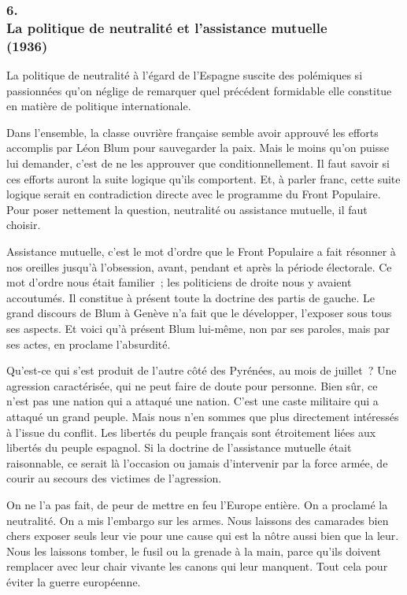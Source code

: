\documentclass[french,twoside]{book} %
\begin{document}
\subsubsection[6. La politique de neutralité et l’assistance mutuelle, (1936)]{6. \\
La politique de neutralité et l’assistance mutuelle \\
(1936)}
\noindent \par
La politique de neutralité à l'égard de l'Espagne suscite des polémiques si passionnées qu'on néglige de remarquer quel précédent formidable elle constitue en matière de politique internationale.\par
Dans l'ensemble, la classe ouvrière française semble avoir approuvé les efforts accomplis par Léon Blum pour sauvegarder la paix. Mais le moins qu'on puisse lui demander, c'est de ne les approuver que conditionnellement. Il faut savoir si ces efforts auront la suite logique qu'ils comportent. Et, à parler franc, cette suite logique serait en contradiction directe avec le programme du Front Populaire. Pour poser nettement la question, neutralité ou assistance mutuelle, il faut choisir.\par
Assistance mutuelle, c'est le mot d'ordre que le Front Populaire a fait résonner à nos oreilles jusqu'à l'obsession, avant, pendant et après la période électorale. Ce mot d'ordre nous était familier ; les politiciens de droite nous y avaient accoutumés. Il constitue à présent toute la doctrine des partis de gauche. Le grand discours de Blum à Genève n'a fait que le développer, l'exposer sous tous ses aspects. Et voici qu'à présent Blum lui-même, non par ses paroles, mais par ses actes, en proclame l'absurdité.\par
Qu'est-ce qui s'est produit de l'autre côté des Pyrénées, au mois de juillet ? Une agression caractérisée, qui ne peut faire de doute pour personne. Bien sûr, ce n'est pas une nation qui a attaqué une nation. C'est une caste militaire qui a attaqué un grand peuple. Mais nous n'en sommes que plus directement intéres­sés à l'issue du conflit. Les libertés du peuple français sont étroitement liées aux libertés du peuple espagnol. Si la doctrine de l'assistance mutuelle était raisonnable, ce serait là l'occasion ou jamais d'intervenir par la force armée, de courir au secours des victimes de l'agression.\par
On ne l'a pas fait, de peur de mettre en feu l'Europe entière. On a proclamé la neutralité. On a mis l'embargo sur les armes. Nous laissons des camarades bien chers exposer seuls leur vie pour une cause qui est la nôtre aussi bien que la leur. Nous les laissons tomber, le fusil ou la grenade à la main, parce qu'ils doivent remplacer avec leur chair vivante les canons qui leur manquent. Tout cela pour éviter la guerre européenne.\par
\end{document}
